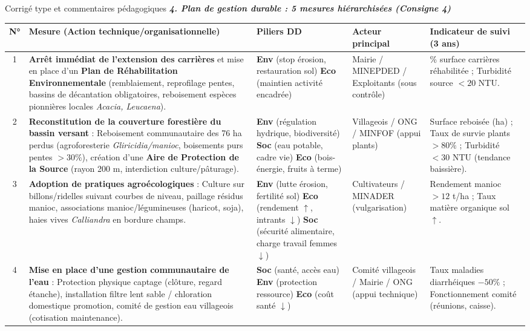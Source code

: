 \documentclass[11pt]{article}
\begin{document}
\begin{exoresolu}{Corrigé type et commentaires pédagogiques}
\emph{\textbf{4. Plan de gestion durable : 5 mesures hiérarchisées (Consigne 4)}}

\begin{center}
\begin{tabularx}{\linewidth}{|c|X|X|X|X|}\hline
\rowcolor{popblueL}
\textbf{N°} & \textbf{Mesure (Action technique/organisationnelle)} & \textbf{Piliers DD} & \textbf{Acteur principal} & \textbf{Indicateur de suivi (3 ans)} \\ \hline
1 & \textbf{Arrêt immédiat de l'extension des carrières} et mise en place d'un \textbf{Plan de Réhabilitation Environnementale} (remblaiement, reprofilage pentes, bassins de décantation obligatoires, reboisement espèces pionnières locales \emph{Acacia, Leucaena}). & \textbf{Env} (stop érosion, restauration sol) \textbf{Eco} (maintien activité encadrée) & Mairie / MINEPDED / Exploitants (sous contrôle) & \% surface carrières réhabilitée ; Turbidité source $< 20$ NTU. \\ \hline
2 & \textbf{Reconstitution de la couverture forestière du bassin versant} : Reboisement communautaire des 76 ha perdus (agroforesterie \emph{Gliricidia/manioc}, boisements purs pentes $> 30\%$), création d'une \textbf{Aire de Protection de la Source} (rayon 200 m, interdiction culture/pâturage). & \textbf{Env} (régulation hydrique, biodiversité) \textbf{Soc} (eau potable, cadre vie) \textbf{Eco} (bois-énergie, fruits à terme) & Villageois / ONG / MINFOF (appui plants) & Surface reboisée (ha) ; Taux de survie plants $> 80\%$ ; Turbidité $< 30$ NTU (tendance baissière). \\ \hline
3 & \textbf{Adoption de pratiques agroécologiques} : Culture sur billons/ridelles suivant courbes de niveau, paillage résidus manioc, associations manioc/légumineuses (haricot, soja), haies vives \emph{Calliandra} en bordure champs. & \textbf{Env} (lutte érosion, fertilité sol) \textbf{Eco} (rendement $\uparrow$, intrants $\downarrow$) \textbf{Soc} (sécurité alimentaire, charge travail femmes $\downarrow$) & Cultivateurs / MINADER (vulgarisation) & Rendement manioc $> 12$ t/ha ; Taux matière organique sol $\uparrow$. \\ \hline
4 & \textbf{Mise en place d'une gestion communautaire de l'eau} : Protection physique captage (clôture, regard étanche), installation filtre lent sable / chloration domestique promotion, comité de gestion eau villageois (cotisation maintenance). & \textbf{Soc} (santé, accès eau) \textbf{Env} (protection ressource) \textbf{Eco} (coût santé $\downarrow$) & Comité villageois / Mairie / ONG (appui technique) & Taux maladies diarrhéiques $-50\%$ ; Fonctionnement comité (réunions, caisse). \\ \hline

\end{tabularx}
\end{center}
\end{exoresolu}
\end{document}
